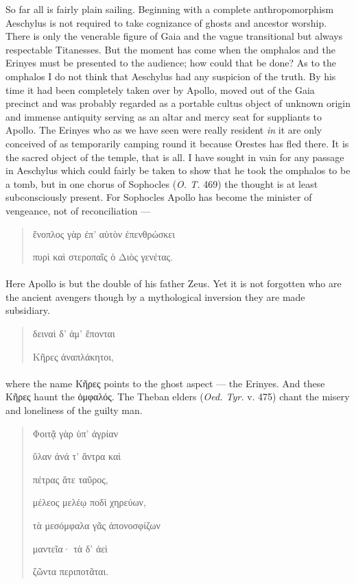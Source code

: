\documentclass[a4paper, 11pt, oneside, polutonikogreek, english]{article}
\begin{document}
So far all is fairly plain sailing. Beginning with a complete anthropomorphism Aeschylus is not required to take cognizance of ghosts and ancestor worship. There is only the venerable figure of Gaia and the vague transitional but always respectable Titanesses. But the moment has come when the omphalos and the Erinyes must be presented to the audience; how could that be done? As to the omphalos I do not think that Aeschylus had any suspicion of the truth. By his time it had been completely taken over by Apollo, moved out of the Gaia precinct and was probably regarded as a portable cultus object of unknown origin and immense antiquity serving as an altar and mercy seat for suppliants to Apollo. The Erinyes who as we have seen were really resident \emph{in} it are only conceived of as temporarily camping round it because Orestes has fled there. It is the sacred object of the temple, that is all. I have sought in vain for any passage in Aeschylus which could fairly be taken to show that he took the omphalos to be a tomb, but in one chorus of Sophocles (\emph{O. T.} 469) the thought is at least subconsciously present. For Sophocles Apollo has become the minister of vengeance, not of reconciliation ---
\begin{quotation}
\large
ἔνοπλος γὰρ ἐπ' αὐτὸν ἐπενθρώσκει

πυρὶ καὶ στεροπαῖς ὁ Διὸς γενέτας.
\end{quotation}
\paragraph{}
Here Apollo is but the double of his father Zeus. Yet it is not forgotten who are the ancient avengers though by a mythological inversion they are made subsidiary.
\begin{quotation}
\large
δειναὶ δ' ἁμ' ἕπονται

Κῆρες ἀναπλάκητοι,
\end{quotation}
\paragraph{}
where the name Κῆρες points to the ghost aspect --- the Erinyes. And these Κῆρες haunt the ὀμφαλός. The Theban elders (\emph{Oed. Tyr.} v. 475) chant the misery and loneliness of the guilty man.
\begin{quotation}
\large
Φοιτᾷ γὰρ ὑπ' ἀγρίαν

ὕλαν ἀνά τ' ἄντρα καὶ

πέτρας ἅτε ταῦρος,

μέλεος μελέῳ ποδὶ χηρεύων,

τὰ μεσόμφαλα γᾶς ἀπονοσφίζων

μαντεῖα· τὰ δ' ἀεὶ

ζῶντα περιποτᾶται.
\end{quotation}
\end{document}
